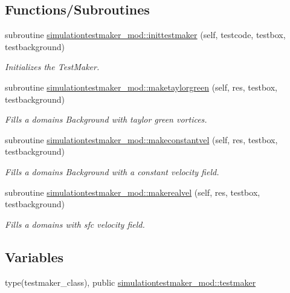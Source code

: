 \subsection*{Functions/\+Subroutines}
\begin{DoxyCompactItemize}
\item 
subroutine \mbox{\hyperlink{namespacesimulationtestmaker__mod_a4ad5df056a516e03a3d1c17f6d3046cf}{simulationtestmaker\+\_\+mod\+::inittestmaker}} (self, testcode, testbox, testbackground)
\begin{DoxyCompactList}\small\item\em Initializes the Test\+Maker. \end{DoxyCompactList}\item 
subroutine \mbox{\hyperlink{namespacesimulationtestmaker__mod_a45bbd32a561c88c18498d88f2d540cc4}{simulationtestmaker\+\_\+mod\+::maketaylorgreen}} (self, res, testbox, testbackground)
\begin{DoxyCompactList}\small\item\em Fills a domain\textquotesingle{}s Background with taylor green vortices. \end{DoxyCompactList}\item 
subroutine \mbox{\hyperlink{namespacesimulationtestmaker__mod_a59ecca693ee5dfe472e2694c9399f0f0}{simulationtestmaker\+\_\+mod\+::makeconstantvel}} (self, res, testbox, testbackground)
\begin{DoxyCompactList}\small\item\em Fills a domain\textquotesingle{}s Background with a constant velocity field. \end{DoxyCompactList}\item 
subroutine \mbox{\hyperlink{namespacesimulationtestmaker__mod_a99df61e4a45020aa1e2d30d33a4e2fa0}{simulationtestmaker\+\_\+mod\+::makerealvel}} (self, res, testbox, testbackground)
\begin{DoxyCompactList}\small\item\em Fills a domain\textquotesingle{}s with sfc velocity field. \end{DoxyCompactList}\end{DoxyCompactItemize}
\subsection*{Variables}
\begin{DoxyCompactItemize}
\item 
type(testmaker\+\_\+class), public \mbox{\hyperlink{namespacesimulationtestmaker__mod_a344a43a231fc0e61e77875fa7ec95b12}{simulationtestmaker\+\_\+mod\+::testmaker}}
\end{DoxyCompactItemize}
